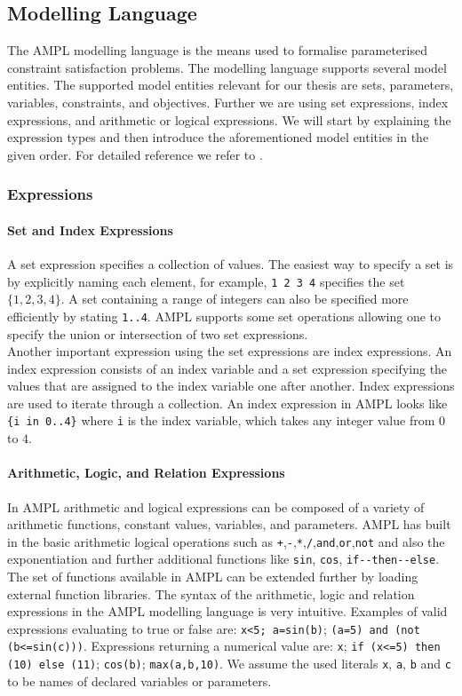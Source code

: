 \subsection{Modelling Language}
The AMPL modelling language is the means used to formalise parameterised constraint satisfaction problems. 
The modelling language supports several model entities. The supported model entities relevant for our thesis are sets, parameters, variables, constraints, and objectives. Further we are using set expressions, index expressions, and arithmetic or logical expressions. We will start by explaining the expression types and then introduce the aforementioned model entities in the given order. For detailed reference we refer to \cite{AMPL}.
\subsubsection{Expressions}
\paragraph{Set and Index Expressions}
A set expression specifies a collection of values. The easiest way to specify a set is by explicitly naming each element, for example, \verb&1 2 3 4& specifies the set $\lbrace 1,2,3,4\rbrace$. A set containing a range of integers can also be specified more efficiently by stating \verb&1..4&. AMPL supports some set operations allowing one to specify the union or intersection of two set expressions.\\
Another important expression using the set expressions are index expressions. An index expression consists of an index variable and a set expression specifying the values that are assigned to the index variable one after another. Index expressions are used to iterate through a collection. An index expression in AMPL looks like \verb&{i in 0..4}& where \verb=i= is the index variable, which takes any integer value from $0$ to $4$.
\paragraph{Arithmetic, Logic, and Relation Expressions}
In AMPL arithmetic and logical expressions can be composed of a variety of arithmetic functions, constant values, variables, and parameters. AMPL has built in the basic arithmetic logical operations such as \verb=+=,\verb=-=,\verb=*=,\verb=/=,\verb=and=,\verb=or=,\verb=not= and also the exponentiation and further additional functions like \verb=sin=, \verb=cos=, \verb=if--then--else=. The set of functions available in AMPL can be extended further by loading external function libraries. The syntax of the arithmetic, logic and relation expressions in the AMPL modelling language is very intuitive. Examples of valid expressions evaluating to true or false are: \verb&x<5; a=sin(b)&; \verb&(a=5) and (not (b<=sin(c)))&. Expressions returning a numerical value are: \verb&x&; \verb&if (x<=5) then (10) else (11)&; \verb&cos(b)&; \verb&max(a,b,10)&. 
We assume the used literals \verb=x=, \verb=a=, \verb=b= and \verb=c= to be names of declared variables or parameters.
